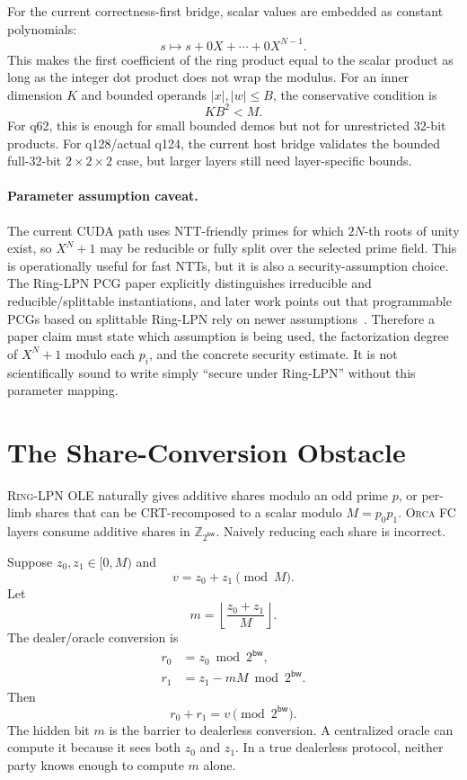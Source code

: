\documentclass[11pt]{article}
\newcommand{\Z}{\mathbb{Z}}
\newcommand{\modtwo}{\Z_{2^{\mathsf{bw}}}}
\newcommand{\Orca}{\textsc{Orca}}
\newcommand{\RingLPN}{\textsc{Ring-LPN}}
\begin{document}
For the current correctness-first bridge, scalar values are embedded as
constant polynomials:
\[
  s \mapsto s + 0X + \cdots + 0X^{N-1}.
\]
This makes the first coefficient of the ring product equal to the scalar
product as long as the integer dot product does not wrap the modulus. For an
inner dimension \(K\) and bounded operands \(|x|,|w|\leq B\), the conservative
condition is
\[
  K B^2 < M .
\]
For q62, this is enough for small bounded demos but not for unrestricted
32-bit products. For q128/actual q124, the current host bridge validates the
bounded full-32-bit \(2\times2\times2\) case, but larger layers still need
layer-specific bounds.

\paragraph{Parameter assumption caveat.}
The current CUDA path uses NTT-friendly primes for which \(2N\)-th roots of
unity exist, so \(X^N+1\) may be reducible or fully split over the selected
prime field. This is operationally useful for fast NTTs, but it is also a
security-assumption choice. The Ring-LPN PCG paper explicitly distinguishes
irreducible and reducible/splittable instantiations, and later work points
out that programmable PCGs based on splittable Ring-LPN rely on newer
assumptions~\cite{boyle2022ringlpn,bombar2023qa}. Therefore a paper claim
must state which assumption is being used, the factorization degree of
\(X^N+1\) modulo each \(p_i\), and the concrete security estimate. It is not
scientifically sound to write simply ``secure under Ring-LPN'' without this
parameter mapping.

\section{The Share-Conversion Obstacle}

\RingLPN{} OLE naturally gives additive shares modulo an odd prime \(p\), or
per-limb shares that can be CRT-recomposed to a scalar modulo
\(M=p_0p_1\). \Orca{} FC layers consume additive shares in \(\modtwo\).
Naively reducing each share is incorrect.

Suppose \(z_0,z_1\in [0,M)\) and
\[
  v = z_0 + z_1 \pmod M.
\]
Let
\[
  m = \left\lfloor \frac{z_0+z_1}{M} \right\rfloor .
\]
The dealer/oracle conversion is
\[
\begin{aligned}
  r_0 &= z_0 \bmod 2^{\mathsf{bw}},\\
  r_1 &= z_1 - mM \bmod 2^{\mathsf{bw}}.
\end{aligned}
\]
Then
\[
  r_0+r_1 = v \pmod {2^{\mathsf{bw}}}.
\]
The hidden bit \(m\) is the barrier to dealerless conversion. A centralized
oracle can compute it because it sees both \(z_0\) and \(z_1\). In a true
dealerless protocol, neither party knows enough to compute \(m\) alone.
\end{document}
